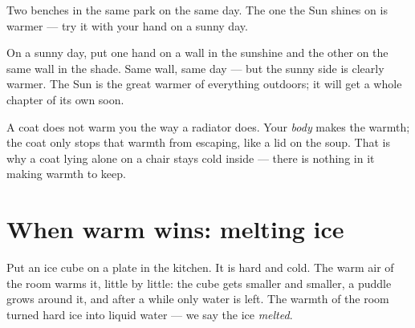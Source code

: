 \begin{omfigure}

{\small Two benches in the same park on the same day. The one the Sun
shines on is warmer --- try it with your hand on a sunny day.}
\end{omfigure}

\begin{example}\label{ex:g1:hot-and-cold:sunshade}
On a sunny day, put one hand on a wall in the sunshine and the other
on the same wall in the shade. Same wall, same day --- but the sunny
side is clearly warmer. The Sun is the great warmer of everything
outdoors; it will get a whole chapter of its own soon.
\end{example}

\begin{remark}\label{rem:g1:hot-and-cold:coat}
A coat does not warm you the way a radiator does. Your \emph{body}
makes the warmth; the coat only stops that warmth from escaping,
like a lid on the soup. That is why a coat lying alone on a chair
stays cold inside --- there is nothing in it making warmth to keep.
\end{remark}

\section{When warm wins: melting ice}

\begin{example}\label{ex:g1:hot-and-cold:icecube}
Put an ice cube on a plate in the kitchen. It is hard and cold. The
warm air of the room warms it, little by little: the cube gets
smaller and smaller, a puddle grows around it, and after a while only
water is left. The warmth of the room turned hard ice into liquid
water --- we say the ice \emph{melted}.
\end{example}

